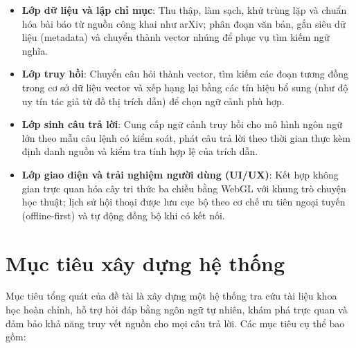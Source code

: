 \begin{itemize}
  \item[--] \textbf{Lớp dữ liệu và lập chỉ mục}: Thu thập, làm sạch, khử trùng lặp và chuẩn hóa bài báo từ nguồn công khai như arXiv; phân đoạn văn bản, gắn siêu dữ liệu (metadata) và chuyển thành vector nhúng để phục vụ tìm kiếm ngữ nghĩa.
  \item[--] \textbf{Lớp truy hồi}: Chuyển câu hỏi thành vector, tìm kiếm các đoạn tương đồng trong cơ sở dữ liệu vector và xếp hạng lại bằng các tín hiệu bổ sung (như độ uy tín tác giả từ đồ thị trích dẫn) để chọn ngữ cảnh phù hợp.
  \item[--] \textbf{Lớp sinh câu trả lời}: Cung cấp ngữ cảnh truy hồi cho mô hình ngôn ngữ lớn theo mẫu câu lệnh có kiểm soát, phát câu trả lời theo thời gian thực kèm định danh nguồn và kiểm tra tính hợp lệ của trích dẫn.
  \item[--] \textbf{Lớp giao diện và trải nghiệm người dùng (UI/UX)}: Kết hợp không gian trực quan hóa cây tri thức ba chiều bằng WebGL với khung trò chuyện học thuật; lịch sử hội thoại được lưu cục bộ theo cơ chế ưu tiên ngoại tuyến (offline-first) và tự động đồng bộ khi có kết nối.
\end{itemize}

\section{Mục tiêu xây dựng hệ thống}
\label{sec:muc-tieu}

Mục tiêu tổng quát của đề tài là xây dựng một hệ thống tra cứu tài liệu khoa học hoàn chỉnh, hỗ trợ hỏi đáp bằng ngôn ngữ tự nhiên, khám phá trực quan và đảm bảo khả năng truy vết nguồn cho mọi câu trả lời. Các mục tiêu cụ thể bao gồm:

